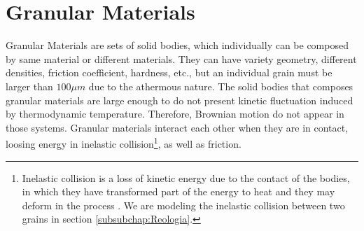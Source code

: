 
\chapter{Granular Materials}
\label{chap:Trabalhos-Relacionados}



    Granular Materials are sets of solid bodies, which individually can be composed by same material or different materials. They can have variety geometry, different densities, friction coefficient, hardness, etc., but an individual grain must be larger than $100\mu m$ \cite{Sands_Powders_and_Grains} due to the athermous nature. The solid bodies that composes granular materials are large enough to do not present kinetic fluctuation induced by thermodynamic temperature. Therefore, Brownian motion do not appear in those systems. Granular materials interact each other when they are in contact, loosing energy in inelastic collision\footnote{Inelastic collision is a loss of kinetic energy due to the contact of the bodies, in which they have transformed part of the energy to heat and they may deform in the process \cite{Halliday}. We are modeling the inelastic collision between two grains in section \ref{subsubchap:Reologia}.}, as well as friction.

    

